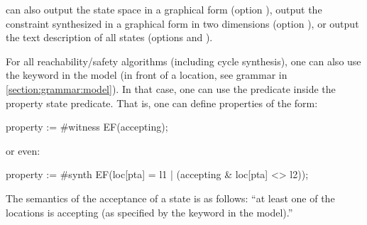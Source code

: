 \imitator{} can also
output the state space in a graphical form (option ),
output the constraint synthesized in a graphical form in two dimensions (option ),
or
output the text description of all states (options  and ).


\begin{remark}\label{remark:accepting}
	For all reachability/safety algorithms (including cycle synthesis), one can also use the  keyword in the model (in front of a location, see grammar in \cref{section:grammar:model}).
	In that case, one can use the  predicate inside the property state predicate.
	That is, one can define properties of the form:

\begin{IMITATORproperty}
property := #witness EF(accepting);
\end{IMITATORproperty}

	or even:

\begin{IMITATORproperty}
property := #synth EF(loc[pta] = l1 | (accepting & loc[pta] <> l2));
\end{IMITATORproperty}

	The semantics of the acceptance of a state is as follows: ``at least one of the locations is accepting (as specified by the  keyword in the model).''

%
\end{remark}

%
%
%
%



